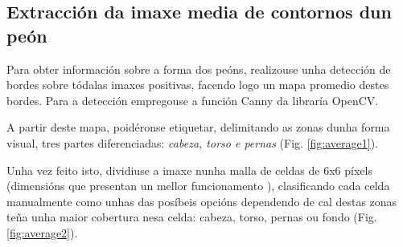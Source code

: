 \documentclass[galician]{./head/uvigo-tfg}
\begin{document}
        \subsection{Extracción da imaxe media de contornos dun peón} Para obter información sobre a forma dos peóns, realizouse unha detección de bordes sobre tódalas imaxes positivas, facendo logo un mapa promedio destes bordes. Para a detección empregouse a función Canny\cite{canny1987computational} da libraría OpenCV\cite{opencv_library}.
        \par A partir deste mapa, poidéronse etiquetar, delimitando as zonas dunha forma visual, tres partes diferenciadas: \textit{cabeza, torso e pernas} (Fig. \ref{fig:average1}).
        \par Unha vez feito isto, dividiuse a imaxe nunha malla de celdas de 6x6 píxels (dimensións que presentan un mellor funcionamento \cite{zhang}), clasificando cada celda manualmente como unhas das posíbeis opcións dependendo de cal destas zonas teña unha maior cobertura nesa celda: cabeza, torso, pernas ou fondo (Fig. \ref{fig:average2}).
        
\end{document}
